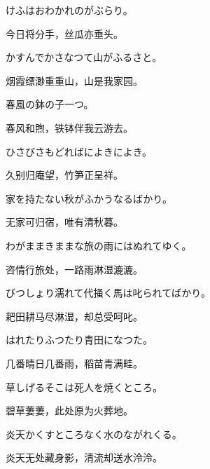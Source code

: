 \begin{haiku}
    {\FH けふはおわかれのがぶらり。}

    {\FK 今日将分手，丝瓜亦垂头。}
\end{haiku}

\begin{haiku}
    {\FH かすんでかさなつて山がふるさと。}

    {\FK 烟霞缥渺重重山，山是我家园。}
\end{haiku}

\begin{haiku}
    {\FH 春風の鉢の子一つ。}

    {\FK 春风和煦，铁钵伴我云游去。}
\end{haiku}

\begin{haiku}
    {\FH ひさびさもどればによきによき。}

    {\FK 久别归庵望，竹笋正呈祥。}
\end{haiku}

\begin{haiku}
    {\FH 家を持たない秋がふかうなるばかり。}

    {\FK 无家可归宿，唯有清秋暮。}
\end{haiku}

\begin{haiku}
    {\FH わがままきままな旅の雨にはぬれてゆく。}

    {\FK 咨情行旅处，一路雨淋湿漉漉。}
\end{haiku}

\begin{haiku}
    {\FH びつしょり濡れて代掻く馬は叱られてばかり。}

    {\FK 耙田耕马尽淋湿，却总受呵叱。}
\end{haiku}

\begin{haiku}
    {\FH はれたりふつたり青田になつた。}

    {\FK 几番晴日几番雨，稻苗青满畦。}
\end{haiku}

\begin{haiku}
    {\FH 草しげるそこは死人を焼くところ。}

    {\FK 碧草萋萋，此处原为火葬地。}
\end{haiku}

\begin{haiku}
    {\FH 炎天かくすところなく水のながれくる。}

    {\FK 炎天无处藏身影，清流却送水泠泠。}
\end{haiku}

